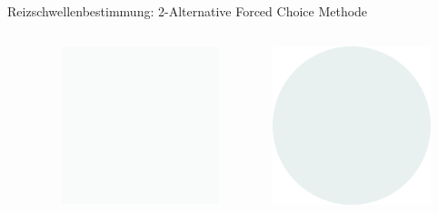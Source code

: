 \documentclass[aspectratio=169]{beamer}
\begin{document}
\begin{frame}{Reizschwellenbestimmung: 2-Alternative Forced Choice Methode}
\begin{columns}[c]
\begin{column}{1cm}
\end{column}
\begin{column}{1cm}
\includegraphics[width=\textwidth]{reizschwelle_AFC_1.png}
\end{column}
\begin{column}{1cm}
\includegraphics[width=\textwidth]{reizschwelle_seriell_4.png}

\end{column}
\end{columns}
\end{frame}
\end{document}
